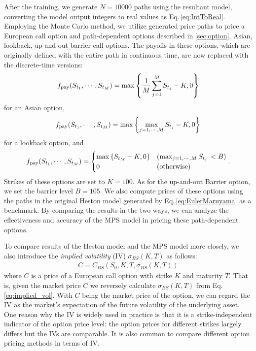{After the training, we generate $N=10000$ paths using the resultant model, converting the model output integers to real values as Eq.\,\eqref{eq:IntToReal}.
Employing the Monte Carlo method, we utilize generated price paths to price a European call option and path-dependent options described in \ref{sec:option}, Asian, lookback, up-and-out barrier call options.
The payoffs in these options, which are originally defined with the entire path in continuous time, are now replaced with the discrete-time versions:
\begin{align}
    f_{\rm pay}(S_{t_1},\cdots,S_{t_M}) = \max \left\{ \frac{1}{M}\sum_{j=1}^M S_{t_j} - K,0 \right\}
\end{align}
for an Asian option,
\begin{align}
    f_{\rm pay}(S_{t_1},\cdots,S_{t_M}) = \max \left\{ \max_{j=1,\cdots,M} S_{t_j} - K , 0 \right\}
\end{align}
for a lookback option, and
\begin{align}
    f_{\rm pay}(S_{t_1},\cdots,S_{t_M}) =
    \begin{cases}
    \max \left\{S_{t_M} - K,0  \right\}& (\max_{j=1,\cdots,M} S_{t_j}  \,  < B  )\\
        0 & (\mathrm{otherwise})
    \end{cases}.
\end{align}
Strikes of these options are set to $K=100$.
As for the up-and-out Barrier option, we set the barrier level $B=105$.
We also compute prices of these options using the paths in the original Heston model generated by Eq.\,\eqref{eq:EulerMaruyama} as a benchmark.
By comparing the results in the two ways, we can analyze the effectiveness and accuracy of the MPS model in pricing these path-dependent options. 

To compare results of the Heston model and the MPS model more closely, we also introduce the {\it implied volatility} (IV) $\sigma_{BS} (K,T)$ as follows:
\begin{align}\label{eq:implied_vol}
    C = C_{BS}(S_0,K,T,\sigma_{BS}(K,T)) 
\end{align}
where $C$ is a price of a European call option with strike $K$ and maturity $T$.
That is, given the market price $C$ we reversely calculate $\sigma_{BS}(K,T)$ from Eq.\,\eqref{eq:implied_vol}.
With $C$ being the market price of the option, we can regard the IV as the market's expectation of the future volatility of the underlying asset.
One reason why the IV is widely used in practice is that it is a strike-independent indicator of the option price level: the option prices for different strikes largely differs but the IVs are comparable.
It is also common to compare different option pricing methods in terms of IV.

}
